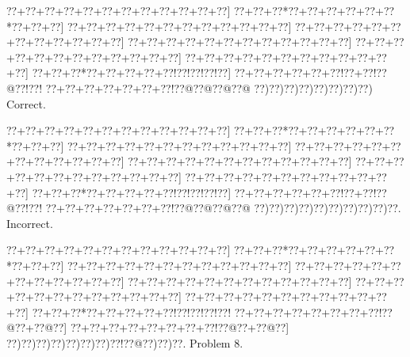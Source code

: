 \documentclass[a5paper]{article}
\begin{document}
\begin{center}
{\goo
\0??+\0??+\0??+\0??+\0??+\0??+\0??+\0??+\0??+\0??+\0??+\0??]
\0??+\0??+\0??*\0??+\0??+\0??+\0??+\0??+\0??*\0??+\0??+\0??]
\0??+\0??+\0??+\0??+\0??+\0??+\0??+\0??+\0??+\0??+\0??+\0??]
\0??+\0??+\0??+\0??+\0??+\0??+\0??+\0??+\0??+\0??+\0??+\0??]
\0??+\0??+\0??+\0??+\0??+\0??+\0??+\0??+\0??+\0??+\0??+\0??]
\0??+\0??+\0??+\0??+\0??+\0??+\0??+\0??+\0??+\0??+\0??+\0??]
\0??+\0??+\0??+\0??+\0??+\0??+\0??+\0??+\0??+\0??+\0??+\0??]
\0??+\0??+\0??*\0??+\0??+\0??+\0??+\0??!\0??!\0??!\0??!\0??]
\0??+\0??+\0??+\0??+\0??+\0??!\0??+\0??!\0??@\0??!\0??!
\0??+\0??+\0??+\0??+\0??+\0??+\0??!\0??@\0??@\0??@\0??@
\0??)\0??)\0??)\0??)\0??)\0??)\0??)\0??)
}
Correct. 

\end{center}
\begin{center}
{\goo
\0??+\0??+\0??+\0??+\0??+\0??+\0??+\0??+\0??+\0??+\0??+\0??]
\0??+\0??+\0??*\0??+\0??+\0??+\0??+\0??+\0??*\0??+\0??+\0??]
\0??+\0??+\0??+\0??+\0??+\0??+\0??+\0??+\0??+\0??+\0??+\0??]
\0??+\0??+\0??+\0??+\0??+\0??+\0??+\0??+\0??+\0??+\0??+\0??]
\0??+\0??+\0??+\0??+\0??+\0??+\0??+\0??+\0??+\0??+\0??+\0??]
\0??+\0??+\0??+\0??+\0??+\0??+\0??+\0??+\0??+\0??+\0??+\0??]
\0??+\0??+\0??+\0??+\0??+\0??+\0??+\0??+\0??+\0??+\0??+\0??]
\0??+\0??+\0??*\0??+\0??+\0??+\0??+\0??!\0??!\0??!\0??!\0??]
\0??+\0??+\0??+\0??+\0??+\0??!\0??+\0??!\0??@\0??!\0??!
\0??+\0??+\0??+\0??+\0??+\0??+\0??!\0??@\0??@\0??@\0??@
\0??)\0??)\0??)\0??)\0??)\0??)\0??)\0??)\0??)\0??.
}
Incorrect. 

\end{center}
\newpage
\begin{center}
{\goo
\0??+\0??+\0??+\0??+\0??+\0??+\0??+\0??+\0??+\0??+\0??+\0??]
\0??+\0??+\0??*\0??+\0??+\0??+\0??+\0??+\0??*\0??+\0??+\0??]
\0??+\0??+\0??+\0??+\0??+\0??+\0??+\0??+\0??+\0??+\0??+\0??]
\0??+\0??+\0??+\0??+\0??+\0??+\0??+\0??+\0??+\0??+\0??+\0??]
\0??+\0??+\0??+\0??+\0??+\0??+\0??+\0??+\0??+\0??+\0??+\0??]
\0??+\0??+\0??+\0??+\0??+\0??+\0??+\0??+\0??+\0??+\0??+\0??]
\0??+\0??+\0??+\0??+\0??+\0??+\0??+\0??+\0??+\0??+\0??+\0??]
\0??+\0??+\0??*\0??+\0??+\0??+\0??+\0??!\0??!\0??!\0??!\0??!
\0??+\0??+\0??+\0??+\0??+\0??+\0??+\0??!\0??@\0??+\0??@\0??]
\0??+\0??+\0??+\0??+\0??+\0??+\0??+\0??!\0??@\0??+\0??@\0??]
\0??)\0??)\0??)\0??)\0??)\0??)\0??)\0??!\0??@\0??)\0??)\0??.
}
Problem 8.

\end{center}
\end{document}
